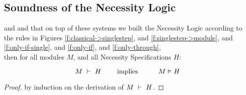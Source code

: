 \subsection{Soundness of the Necessity Logic}
\label{s:soundness}

\begin{theorem}[Soundness]
 and  and that on top of these systems we built
 the Necessity Logic according to the rules in Figures  \ref{f:classical->singlestep}, and 
 \ref{f:singlestep->module}, and \ref{f:only-if-single}, and \ref{f:only-if},  and \ref{f:only-through}, \\
 then for    all modules $M$, and all Necessity Specifications  $H$:
 
 $$\proves{M}{H}\ \ \ \ \ \ \ \mbox{implies}\ \ \ \ \ \  \ \ \ \satisfies{M}{H}$$
\end{theorem}

\begin{proof}
by induction on the derivation of $M\ \vdash\ H$.
\end{proof}


